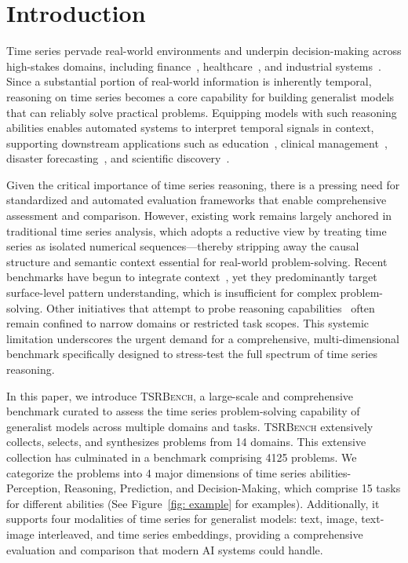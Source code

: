 \documentclass{article}
\theoremstyle{plain}
\theoremstyle{definition}
\theoremstyle{remark}
\newcommand\ours{\textsc{TSRBench}\xspace}
\theoremstyle{plain}
\begin{document}
\section{Introduction}
\label{sec:intro}
Time series pervade real-world environments and underpin decision-making across high-stakes domains, including finance~\citep{dong2024fnspid}, healthcare~\citep{morid2023time}, and industrial systems~\citep{yan2024comprehensive}. Since a substantial portion of real-world information is inherently temporal, reasoning on time series becomes a core capability for building generalist models that can reliably solve practical problems. Equipping models with such reasoning abilities enables automated systems to interpret temporal signals in context, supporting downstream applications such as education~\citep{mao2024time}, clinical management~\citep{matowe2003interrupted}, disaster forecasting~\citep{hakim2024flood}, and scientific discovery~\citep{yu2025physics}.

Given the critical importance of time series reasoning, there is a pressing need for standardized and automated evaluation frameworks that enable comprehensive assessment and comparison. However, existing work remains largely anchored in traditional time series analysis, which adopts a reductive view by treating time series as isolated numerical sequences—thereby stripping away the causal structure and semantic context essential for real-world problem-solving. Recent benchmarks have begun to integrate context~\citep{williams2024context, liu2024time, cai2024timeseriesexam, kong2025time, wu2025scits}, yet they predominantly target surface-level pattern understanding, which is insufficient for complex problem-solving. Other initiatives that attempt to probe reasoning capabilities~\citep{chen2025mtbench, wang2025itformer, guan2025timeomni} often remain confined to narrow domains or restricted task scopes. This systemic limitation underscores the urgent demand for a comprehensive, multi-dimensional benchmark specifically designed to stress-test the full spectrum of time series reasoning.

In this paper, we introduce \ours, a large-scale and comprehensive benchmark curated to assess the time series problem-solving capability of generalist models across multiple domains and tasks. \ours extensively collects, selects, and synthesizes problems from 14 domains. This extensive collection has culminated in a benchmark comprising 4125 problems. We categorize the problems into 4 major dimensions of time series abilities-Perception, Reasoning, Prediction, and Decision-Making, which comprise 15 tasks for different abilities (See Figure~\ref{fig: example} for examples).  Additionally, it supports four modalities of time series for generalist models: text, image, text-image interleaved, and time series embeddings, providing a comprehensive evaluation and comparison that modern AI systems could handle.
\end{document}
